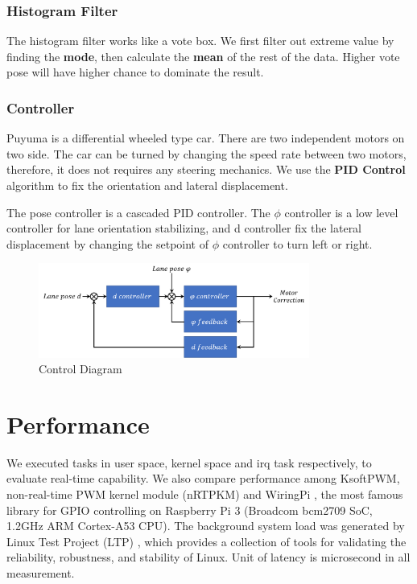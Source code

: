 \documentclass[conference]{IEEEtran}
\begin{document}
\subsubsection{Histogram Filter}

The histogram filter works like a vote box. We first filter out extreme value by finding the \textbf{mode}, then calculate the \textbf{mean} of the rest of the data. Higher vote pose will have higher chance to dominate the result.

\subsubsection{Controller}

Puyuma is a differential wheeled type car. There are two independent motors on two side. The car can be turned by changing the speed rate between two motors, therefore, it does not requires any steering mechanics. We use the \textbf{PID Control} algorithm to fix the orientation and lateral displacement.

The pose controller is a cascaded PID controller. The $\phi$ controller is a low level controller for lane orientation stabilizing, and d controller fix the lateral displacement by changing the setpoint of $\phi$ controller to turn left or right.

\begin{figure}	
	\centering
	\includegraphics[width=3.5in]{img/controller.png}
	\caption{Control Diagram}
	\label{fig:controller}
\end{figure}

\section{Performance}

We executed tasks in user space, kernel space and irq task respectively, to evaluate real-time capability. We also compare performance among KsoftPWM, non-real-time PWM kernel module (nRTPKM) and WiringPi \cite{WiringPi}, the most famous library for GPIO controlling on Raspberry Pi 3 (Broadcom bcm2709 SoC, 1.2GHz ARM Cortex-A53 CPU). The background system load was generated by Linux Test Project (LTP) \cite{LTP}, which provides a collection of tools for validating the reliability, robustness, and stability of Linux. Unit of latency is microsecond in all measurement.
\end{document}
